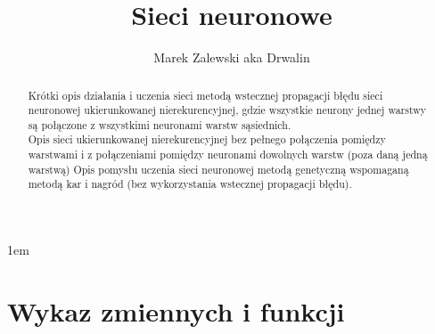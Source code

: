 \documentclass[]{article}
\title{Sieci neuronowe}
\author{Marek Zalewski aka Drwalin}
\begin{document}
\maketitle

\newpage
\begin{abstract}
	Krótki opis działania i uczenia sieci metodą wstecznej propagacji błędu sieci neuronowej ukierunkowanej nierekurencyjnej, gdzie wszystkie neurony jednej warstwy są połączone z wszystkimi neuronami warstw sąsiednich. \\
	Opis sieci ukierunkowanej nierekurencyjnej bez pełnego połączenia pomiędzy warstwami i z połączeniami pomiędzy neuronami dowolnych warstw (poza daną jedną warstwą)
	Opis pomysłu uczenia sieci neuronowej metodą genetyczną wspomaganą metodą kar i nagród (bez wykorzystania wstecznej propagacji błędu).
\end{abstract}

\newpage
\parindent 1em%
\tableofcontents

\newpage
\section{Wykaz zmiennych i funkcji}
\end{document}
